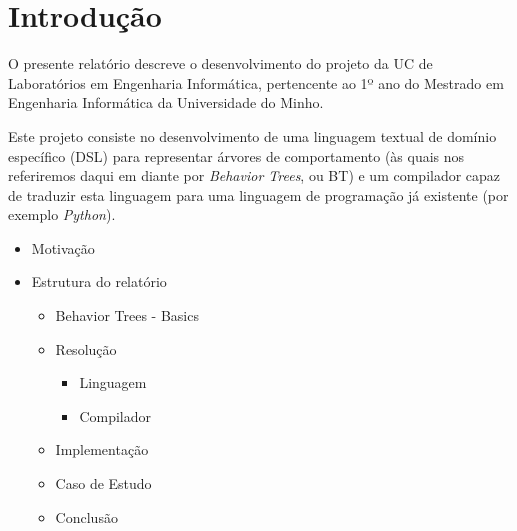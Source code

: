 
\chapter{Introdução} %

\label{Chapter1} %


\newcommand{\keyword}[1]{\textbf{#1}}
\newcommand{\tabhead}[1]{\textbf{#1}}
\newcommand{\code}[1]{\texttt{#1}}
\newcommand{\file}[1]{\texttt{\bfseries#1}}
\newcommand{\option}[1]{\texttt{\itshape#1}}


O presente relatório descreve o desenvolvimento do projeto da UC de Laboratórios em Engenharia Informática, pertencente ao 1º ano do Mestrado em Engenharia Informática da Universidade do Minho.

Este projeto consiste no desenvolvimento de uma linguagem textual de domínio específico (DSL) para representar árvores de comportamento (às quais nos referiremos daqui em diante por \textit{Behavior Trees}, ou BT) e um compilador capaz de traduzir esta linguagem para uma linguagem de programação já existente (por exemplo \textit{Python}).



\begin{itemize}
    \item Motivação
    \item Estrutura do relatório
    \begin{itemize}
        \item Behavior Trees - Basics
        \item Resolução
        \begin{itemize}
            \item Linguagem
            \item Compilador
        \end{itemize}
        \item Implementação
        \item Caso de Estudo
        \item Conclusão
    \end{itemize}
\end{itemize}

